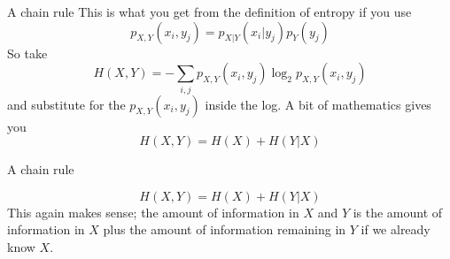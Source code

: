 \documentclass{beamer}
\newcommand{\crish}{\color{reddish}}
\newcommand{\cbla}{\color{black}}
\newcommand{\sm}{\color{reddish}$}
\newcommand{\fm}{$\color{black}{}}
\begin{document}
\begin{frame}{A chain rule}
  This is what you get from the definition of entropy if you use
  \crish
  $$
p_{X,Y}(x_i,y_j)=p_{X|Y}(x_i|y_j)p_Y{(y_j)}
$$
\cbla
So take
\crish
$$
H(X,Y)=-\sum_{i,j} p_{X,Y}(x_i,y_j)\log_2{p_{X,Y}(x_i,y_j)}
$$
\cbla
and substitute for the \sm{}p_{X,Y}(x_i,y_j)\fm{} inside the log. A bit of mathematics gives you
\crish
$$
H(X,Y)=H(X)+H(Y|X)
$$
\cbla
\end{frame}


\begin{frame}{A chain rule}

\crish
$$
H(X,Y)=H(X)+H(Y|X)
$$ \cbla This again makes sense; the amount of information in
\sm{}X\fm{} and \sm{}Y\fm{} is the amount of information in
\sm{}X\fm{} plus the amount of information remaining in \sm{}Y\fm{} if
we already know \sm{}X\fm{}.

\end{frame}
\end{document}
